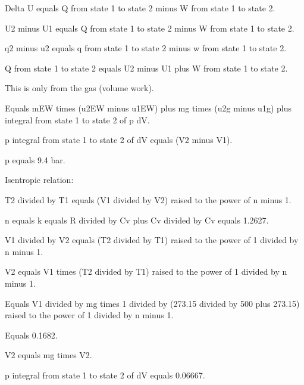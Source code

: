 Delta U equals Q from state 1 to state 2 minus W from state 1 to state 2.  

U2 minus U1 equals Q from state 1 to state 2 minus W from state 1 to state 2.  

q2 minus u2 equals q from state 1 to state 2 minus w from state 1 to state 2.  

Q from state 1 to state 2 equals U2 minus U1 plus W from state 1 to state 2.  

This is only from the gas (volume work).  

Equals mEW times (u2EW minus u1EW) plus mg times (u2g minus u1g) plus integral from state 1 to state 2 of p dV.  

p integral from state 1 to state 2 of dV equals (V2 minus V1).  

p equals 9.4 bar.  

Isentropic relation:  

T2 divided by T1 equals (V1 divided by V2) raised to the power of n minus 1.  

n equals k equals R divided by Cv plus Cv divided by Cv equals 1.2627.  

V1 divided by V2 equals (T2 divided by T1) raised to the power of 1 divided by n minus 1.  

V2 equals V1 times (T2 divided by T1) raised to the power of 1 divided by n minus 1.  

Equals V1 divided by mg times 1 divided by (273.15 divided by 500 plus 273.15) raised to the power of 1 divided by n minus 1.  

Equals 0.1682.  

V2 equals mg times V2.  

p integral from state 1 to state 2 of dV equals 0.06667.